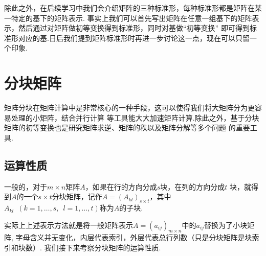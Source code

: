除此之外，在后续学习中我们会介绍矩阵的三种标准形，每种标准形都是矩阵在某一特定的基下的矩阵表示.
事实上我们可以首先写出矩阵在任意一组基下的矩阵表示，然后通过对矩阵做初等变换得到标准形，同时对基做``初等变换''
即可得到标准形对应的基.日后我们提到矩阵标准形时再进一步讨论这一点，现在可以只留一个印象.

\section{分块矩阵}
矩阵分块在矩阵计算中是非常核心的一种手段，这可以使得我们将大矩阵分为更容易处理的小矩阵，结合并行计算
等工具能大大加速矩阵计算.除此之外，基于分块矩阵的初等变换也是研究矩阵求逆、矩阵的秩以及矩阵分解等多个问题
的重要工具.
\subsection{运算性质}
\begin{definition}
    一般的，对于$m \times n$矩阵$A$，如果在行的方向分成$s$块，在列的方向分成$t$
    块，就得到$A$的一个$s \times t$分块矩阵，记作$A=(A_{kl})_{s \times t}$，其中
    $A_{kl}\enspace(k=1,\ldots,s,\enspace l=1,\ldots,t)$称为$A$的子块.
\end{definition}
实际上上述表示方法就是将一般矩阵表示$A=(a_{ij})_{m \times n}$中的$a_{ij}$替换为了小块矩阵,
字母含义并无变化，内层代表索引，外层代表总行列数（只是分块矩阵是块索引和块数）.
我们接下来考察分块矩阵的运算性质.
